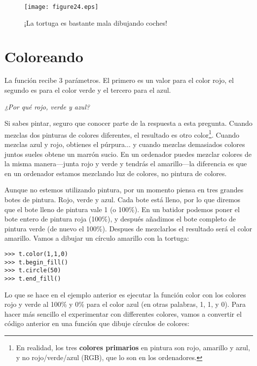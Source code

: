 \begin{figure}
\begin{center}
\texttt{[image: figure24.eps]}
\end{center}
\caption{¡La tortuga es bastante mala dibujando coches!}\label{fig24}
\end{figure}

\section{Coloreando}

La función  recibe 3 parámetros. El primero es un valor para el color rojo, el segundo es para el color verde y el tercero para el azul.
\par
\emph{¿Por qué rojo, verde y azul?}
\par
Si sabes pintar, seguro que conocer parte de la respuesta a esta pregunta.  Cuando mezclas dos pinturas de colores diferentes, el resultado es otro color\footnote{En realidad, los tres \textbf{colores primarios} en pintura son rojo, amarillo y azul,  y no rojo/verde/azul (RGB), que lo son en los ordenadores.}.  Cuando mezclas azul y rojo, obtienes el púrpura$\ldots$ y cuando mezclas demasiados colores juntos sueles obtene un marrón sucio.  En un ordenador puedes mezclar colores de la misma manera---junta rojo y verde y tendrás el amarillo---la diferencia es que en un ordenador estamos mezclando luz de colores, no pintura de colores.
 
Aunque no estemos utilizando pintura, por un momento piensa en tres grandes botes de pintura.  Rojo, verde y azul.  Cada bote está lleno, por lo que diremos que el bote lleno de pintura vale 1 (o 100\%).  En un batidor podemos poner el bote entero de pintura roja (100\%), y después añadimos el bote completo de pintura verde (de nuevo el 100\%).  Despues de mezclarlos el resultado será el color amarillo.  Vamos a dibujar un círculo amarillo con la tortuga:

\begin{listing}
\begin{verbatim}
>>> t.color(1,1,0)
>>> t.begin_fill()
>>> t.circle(50)
>>> t.end_fill()
\end{verbatim}
\end{listing}

Lo que se hace en el ejemplo anterior es ejecutar la función color con los colores rojo y verde al 100\% y 0\% para el color azul (en otras palabras, 1, 1, y 0).  Para hacer más sencillo el experimentar con differentes colores, vamos a convertir el código anterior en una función que dibuje círculos de colores:

